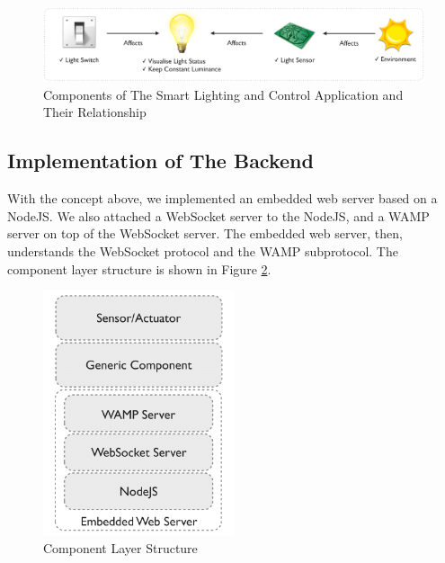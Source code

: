 \begin{figure}[t]
  \begin{center}
    \includegraphics[width=1\textwidth]{images/components-relationship.pdf}
    \caption{Components of The Smart Lighting and Control Application and Their Relationship}
    \label{fig:components-relationship}
  \end{center}
\end{figure}

\subsection{Implementation of The Backend}
With the concept above, we implemented an embedded web server based on a NodeJS. We also attached a WebSocket server to the NodeJS, and a WAMP server on top of the WebSocket server. The embedded web server, then, understands the WebSocket protocol and the WAMP subprotocol. The component layer structure is shown in Figure  \ref{fig:component-layer-structure}. 

\begin{figure}[t]
  \begin{center}
    \includegraphics[width=0.5\textwidth]{images/component-layer-structure.pdf}
    \caption{Component Layer Structure}
    \label{fig:component-layer-structure}
  \end{center}
\end{figure}

